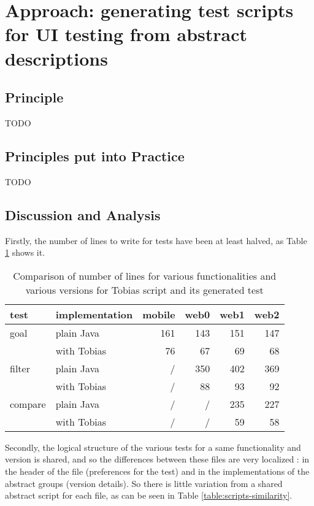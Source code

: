 \documentclass{chi-ext}
\begin{document}
\section{Approach: generating test scripts for UI testing from abstract descriptions}
\subsection{Principle}
TODO

\subsection{Principles put into Practice}
TODO

\subsection{Discussion and Analysis}
Firstly, the number of lines to write for tests have been at least halved, as Table \ref{table:scriptssize} shows it.
\begin{table}
\begin{tabular}{|l l|r r r r|}
\hline
test		&	implementation&	mobile	&	web0	&	web1	&	web2	\\
\hline
goal		&	plain Java	&	161		&	143		&	151		&	147		\\
			&	with Tobias	&	76		&	67		&	69		&	68		\\
\hline
filter		&	plain Java	&	/		&	350		&	402		&	369		\\
			&	with Tobias	&	/		&	88		&	93		&	92		\\
\hline
compare	&	plain Java	&	/		&	/		&	235		&	227		\\
			&	with Tobias	&	/		&	/		&	59		&	58		\\
\hline
\end{tabular}
\caption{Comparison of number of lines for various functionalities and various versions for Tobias script and its generated test}
\label{table:scriptssize}
\end{table}
Secondly, the logical structure of the various tests for a same functionality and version is shared, and so the differences between these files are very localized : in the header of the file (preferences for the test) and in the implementations of the abstract groups (version details). So there is little variation from a shared abstract script for each file, as can be seen in Table \ref{table:scripts-similarity}.
\end{document}
